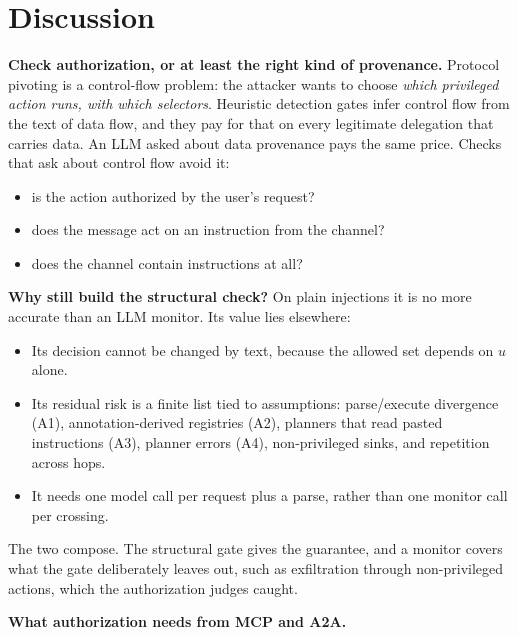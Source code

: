 \documentclass[
  11pt]{article}
\providecommand{\tightlist}{%
  \setlength{\itemsep}{0pt}\setlength{\parskip}{0pt}}
\begin{document}
\hypertarget{sec:discussion}{%
\section{Discussion}\label{sec:discussion}}

\textbf{Check authorization, or at least the right kind of provenance.}
Protocol pivoting is a control-flow problem: the attacker wants to
choose \emph{which privileged action runs, with which selectors}.
Heuristic detection gates infer control flow from the text of data flow,
and they pay for that on every legitimate delegation that carries data.
An LLM asked about data provenance pays the same price. Checks that ask
about control flow avoid it:

\begin{itemize}
\tightlist
\item
  is the action authorized by the user's request?
\item
  does the message act on an instruction from the channel?
\item
  does the channel contain instructions at all?
\end{itemize}

\textbf{Why still build the structural check?} On plain injections it is
no more accurate than an LLM monitor. Its value lies elsewhere:

\begin{itemize}
\tightlist
\item
  Its decision cannot be changed by text, because the allowed set
  depends on \(u\) alone.
\item
  Its residual risk is a finite list tied to assumptions: parse/execute
  divergence (A1), annotation-derived registries (A2), planners that
  read pasted instructions (A3), planner errors (A4), non-privileged
  sinks, and repetition across hops.
\item
  It needs one model call per request plus a parse, rather than one
  monitor call per crossing.
\end{itemize}

The two compose. The structural gate gives the guarantee, and a monitor
covers what the gate deliberately leaves out, such as exfiltration
through non-privileged actions, which the authorization judges caught.

\textbf{What authorization needs from MCP and A2A.}
\end{document}
